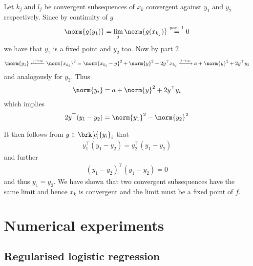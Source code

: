 \begin{frame}
	\begin{proofs}
	Let $k_j$ and $l_j$ be convergent subsequences of $x_k$ convergent against $y_1$ and $y_2$ respectively. Since by continuity of $g$
	\begin{align*}
		\norm{g(y_1)}=\lim_j\norm{g(x_{k_j})}\stackrel{\text{part 1}}{=}0
	\end{align*}
	we have that $y_1$ is a fixed point and $y_2$ too.
	Now by part 2
	\begin{align*}
		\norm{y_1} 
		\xleftarrow{j\to\infty} \norm{x_{k_j}}^2
		= \norm{x_{k_j}-y}^2+\norm{y}^2+2y^\top x_{k_j}
		\xrightarrow{j\to\infty} a+\norm{y}^2+2y^\top y_1
	\end{align*}
	and analogously for $y_2$. Thus
	\begin{align*}
		\norm{y_i}=a+\norm{y}^2+2y^\top y_i
	\end{align*}
	which implies
	\begin{align*}
		2y^\top(y_1-y_2) = \norm{y_1}^2-\norm{y_2}^2
	\end{align*}
	\end{proofs}
\end{frame}


\begin{frame}
	\begin{proofs}
	It then follows from $y\in\brk[c]{y_i}_i$ that
	\begin{align*}
		y_1^\top(y_1-y_2) = y_2^\top(y_1-y_2)
	\end{align*}
	and further
	\begin{align*}
		(y_1-y_2)^\top(y_1-y_2) = 0
	\end{align*}
	and thus $y_1=y_2$. We have shown that two convergent subsequences have the same limit and hence $x_k$ is convergent and the limit must be a fixed point of $f$.
	\end{proofs}
\end{frame}


\section{Numerical experiments}

\subsection{Regularised logistic regression}

